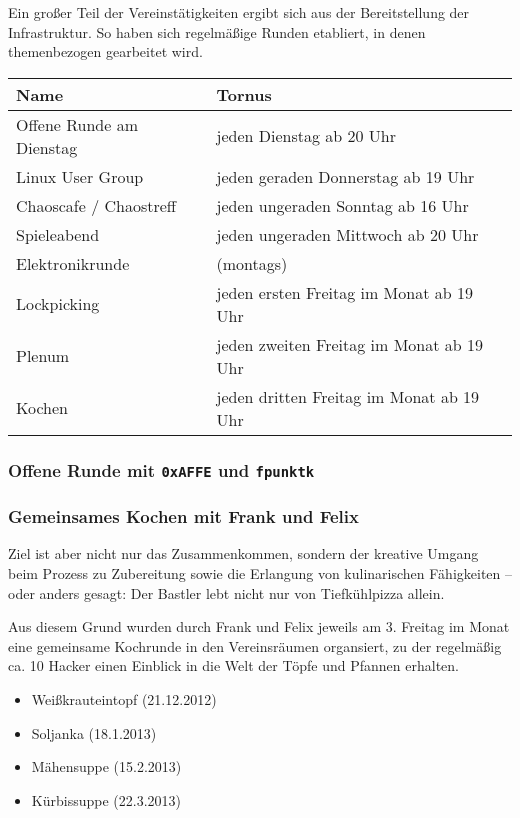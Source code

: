 \documentclass[10pt,DIV16]{scrartcl}
\begin{document}
Ein großer Teil der Vereinstätigkeiten ergibt sich aus der
Bereitstellung der Infrastruktur. So haben sich regelmäßige Runden
etabliert, in denen themenbezogen gearbeitet wird.

\begin{table}[h]
	\begin{tabular}{l|l}
		Name   &  Tornus \\ \hline
		Offene Runde am Dienstag   &  jeden Dienstag ab 20 Uhr\\
		Linux User Group   &  jeden geraden Donnerstag ab 19 Uhr\\
		Chaoscafe / Chaostreff   &  jeden ungeraden Sonntag ab 16 Uhr\\
		Spieleabend   &  jeden ungeraden Mittwoch ab 20 Uhr\\
		Elektronikrunde   &  (montags)\\
		Lockpicking   &  jeden ersten Freitag im Monat ab 19 Uhr\\
		Plenum   &  jeden zweiten Freitag im Monat ab 19 Uhr\\
		Kochen   &  jeden dritten Freitag im Monat ab 19 Uhr\\
\end{tabular}
\end{table}

\subsubsection{Offene Runde mit \texttt{0xAFFE} und \texttt{fpunktk}}

\subsubsection{Gemeinsames Kochen mit Frank und Felix}

Ziel ist aber nicht nur das Zusammenkommen, sondern der kreative
Umgang beim Prozess zu Zubereitung sowie die Erlangung von
kulinarischen Fähigkeiten -- oder anders gesagt: Der Bastler lebt
nicht nur von Tiefkühlpizza allein.

Aus diesem Grund wurden durch Frank und Felix jeweils am 3. Freitag
im Monat eine gemeinsame Kochrunde in den Vereinsräumen organsiert,
zu der regelmäßig ca. 10 Hacker einen Einblick in die Welt der Töpfe
und Pfannen erhalten.

\begin{itemize}
	\item Weißkrauteintopf (21.12.2012)
	\item Soljanka (18.1.2013)
	\item Mähensuppe (15.2.2013)
	\item Kürbissuppe (22.3.2013)
\end{itemize}
\end{document}
